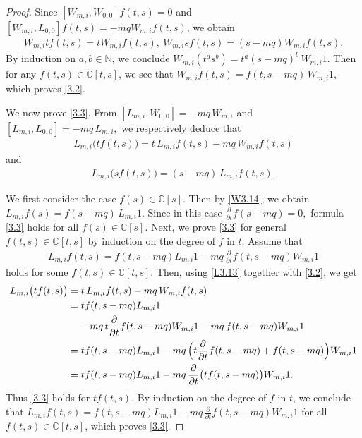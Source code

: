 \documentclass[a4paper]{amsart}
\numberwithin{equation}{section}
\begin{document}
 \begin{proof}
     Since $[W_{m,i},W_{0,0}] f(t,s)=0$ and $[W_{m,i},L_{0,0}] f(t,s)=-mqW_{m,i} f(t,s)$, we obtain
     \begin{align*}
         W_{m,i} tf(t,s)=tW_{m,i} f(t,s),\ 
         W_{m,i} sf(t,s)=(s-mq)W_{m,i} f(t,s).
     \end{align*}
By induction on $a,b\in \mathbb N$, we conclude 
 $
W_{m,i}(t^as^b)=t^a(s-mq)^b\,W_{m,i}1.$
Then for any $f(t,s)\in \mathbb C[t,s]$, we see that 
$
W_{m,i}f(t,s)=f(t,s-mq)\,W_{m,i} 1,
$
which proves \eqref{3.2}. 

We now prove \eqref{3.3}. From
$
[L_{m,i},W_{0,0}]=-mq\,W_{m,i}$ and $ [L_{m,i},L_{0,0}]=-mq\,L_{m,i},
$
 we respectively  deduce that 
\begin{eqnarray}\label{L3.13}
L_{m,i}\bigl(t f(t,s)\bigr)=t\,L_{m,i}f(t,s)-mq\,W_{m,i}f(t,s)
\end{eqnarray}
and
\begin{eqnarray}\label{W3.14}
L_{m,i}\bigl(s f(t,s)\bigr)=(s-mq)\,L_{m,i}f(t,s).
\end{eqnarray}

We first consider the case $f(s)\in \mathbb C[s]$. Then  by \eqref{W3.14}, we obtain
$
L_{m,i}f(s)=f(s-mq)\,L_{m,i}  1.$
Since in this case $\frac{\partial}{\partial t}f(s-mq)=0,$
formula \eqref{3.3} holds for all $f(s)\in \mathbb C[s]$.
Next, we prove \eqref{3.3} for general $f(t,s)\in \mathbb C[t,s]$ by induction on the degree of $f$ in $t$. Assume that
\begin{align*}
L_{m,i}f(t,s)=f(t,s-mq)L_{m,i}  1-mq\, \frac{\partial}{\partial t}f(t,s-mq)W_{m,i}1
\end{align*}
holds for some $f(t,s)\in \mathbb C[t,s]$. Then, using \eqref{L3.13} together with \eqref{3.2}, we get
\begin{align*}
L_{m,i}\bigl(t f(t,s)\bigr)
&=t\,L_{m,i}f(t,s)-mq\,W_{m,i}f(t,s)\\
&=t f(t,s-mq)L_{m,i}1\\
&\quad-mq\,t\frac{\partial}{\partial t}f(t,s-mq)W_{m,i}1
-mq\,f(t,s-mq)W_{m,i}1 \\
&=t f(t,s-mq)L_{m,i} 1 
   -mq\, \Bigl(t\frac{\partial}{\partial t}f(t,s-mq)+f(t,s-mq)\Bigr)W_{m,i}1\\
&=t f(t,s-mq)L_{m,i}  1
   -mq\, \frac{\partial}{\partial t}\bigl(t f(t,s-mq)\bigr)W_{m,i}1.
\end{align*}
Thus \eqref{3.3} holds for $tf(t,s)$. By induction on the degree of $f$ in $t$, we conclude that
$
L_{m,i}f(t,s)=f(t,s-mq)L_{m,i} 1 -mq\,\frac{\partial}{\partial t}f(t,s-mq)W_{m,i} 1
$
for all $f(t,s)\in \mathbb C[t,s]$, which proves \eqref{3.3}.
 \end{proof}
\end{document}
